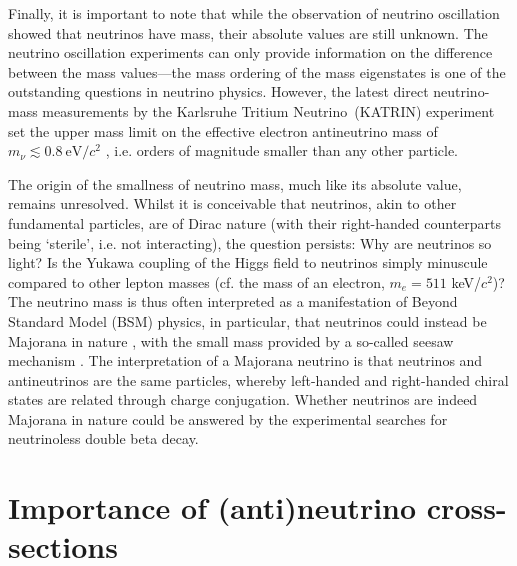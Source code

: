 
Finally, it is important to note that while the observation of neutrino oscillation showed that neutrinos have mass, their absolute values are still unknown. The neutrino oscillation experiments can only provide information on the difference between the mass values---the mass ordering of the mass eigenstates is one of the outstanding questions in neutrino physics. However, the latest direct neutrino-mass measurements by the Karlsruhe Tritium Neutrino~(KATRIN) experiment set the upper mass limit on the effective electron antineutrino mass of $m_{\nu} \lesssim 0.8 \: \text{eV}/c^2$ \cite{Aker_2022}, i.e. orders of magnitude smaller than any other particle. 

The origin of the smallness of neutrino mass, much like its absolute value, remains unresolved. Whilst it is conceivable that neutrinos, akin to other fundamental particles, are of Dirac nature (with their right-handed counterparts being `sterile', i.e. not interacting), the question persists: Why are neutrinos so light? Is the Yukawa coupling of the Higgs field to neutrinos simply minuscule compared to other lepton masses (cf. the mass of an electron, $m_{e} = 511$ keV/$c^2$)? The neutrino mass is thus often interpreted as a manifestation of Beyond Standard Model (BSM) physics, in particular, that neutrinos could instead be Majorana in nature \cite{Majorana}, with the small mass provided by a so-called seesaw mechanism \cite{MOHAPATRA_2005}. The interpretation of a Majorana neutrino is that neutrinos and antineutrinos are the same particles, whereby left-handed and right-handed chiral states are related through charge conjugation. Whether neutrinos are indeed Majorana in nature could be answered by the experimental searches for neutrinoless double beta decay.
\vspace{10pt}


\section{Importance of (anti)neutrino cross-sections}

